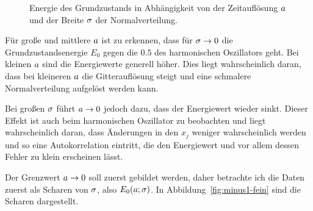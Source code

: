 \begin{figure}[htbp]
    \centering
    \caption{%
        Energie des Grundzustands in Abhängigkeit von der Zeitauflösung
        $a$ und der Breite $\sigma$ der Normalverteilung.
    }
    \label{fig:mesh-e0}
\end{figure}

Für große und mittlere $a$ ist zu erkennen, dass für $\sigma \to
0$ die Grundzustandsenergie $E_0$ gegen die $\num{0.5}$ des harmonischen
Oszillators geht. Bei kleinen $a$ sind die Energiewerte generell höher.
Dies liegt wahrscheinlich daran, dass bei kleineren $a$ die
Gitterauflösung steigt und eine schmalere Normalverteilung aufgelöst werden
kann.

Bei großen $\sigma$ führt $a \to 0$ jedoch dazu, dass der
Energiewert wieder sinkt. Dieser Effekt ist auch beim harmonischen Oszillator
zu beobachten und liegt wahrscheinlich daran, dass Änderungen in den $x_j$
weniger wahrscheinlich werden und so eine Autokorrelation eintritt, die den
Energiewert und vor allem dessen Fehler zu klein erscheinen lässt.

Der Grenzwert $a \to 0$ soll zuerst gebildet werden, daher betrachte
ich die Daten zuerst als Scharen von $\sigma$, also $E_0(a;
\sigma)$. In Abbildung~\ref{fig:minus1-fein} sind die Scharen dargestellt.

